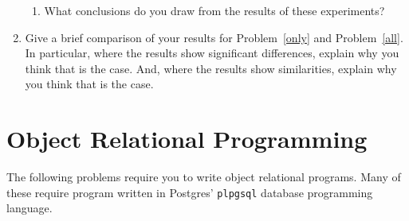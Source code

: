\documentclass{article}
\begin{document}
\begin{enumerate}[resume]
\begin{enumerate}
\item What conclusions do you draw from the results of these experiments?
\end{enumerate}

\item  Give a brief comparison of your results for Problem~\ref{only} and Problem~\ref{all}.   In particular, where the results show significant differences, explain why you think that is the case.   And, where the results show similarities, explain why you think that is the case.
\end{enumerate}

\newpage
\section{Object Relational Programming}

The following problems require you to write object relational programs.   Many of these require program written in Postgres' {\tt plpgsql} database programming language.
\end{document}
